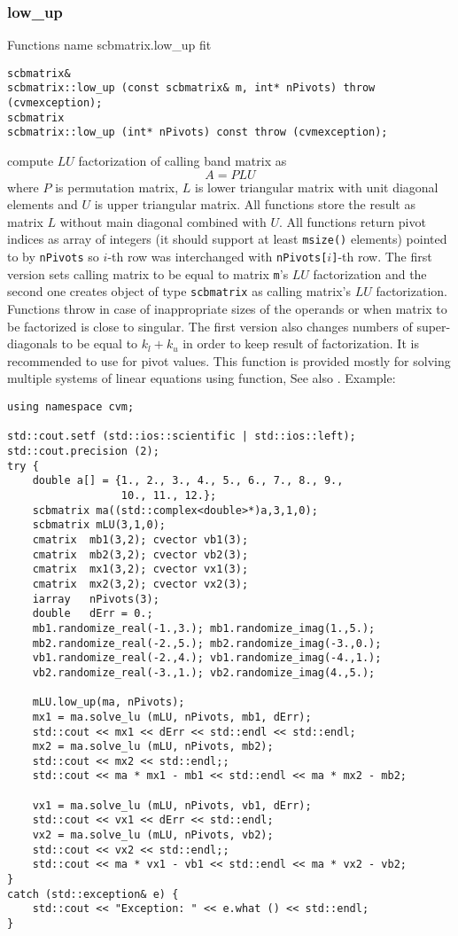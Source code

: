 \subsubsection{low\_up}
Functions%
\pdfdest name {scbmatrix.low_up} fit
\begin{verbatim}
scbmatrix& 
scbmatrix::low_up (const scbmatrix& m, int* nPivots) throw (cvmexception);
scbmatrix
scbmatrix::low_up (int* nPivots) const throw (cvmexception);
\end{verbatim}
compute  $LU$ factorization of  calling band matrix as
\begin{equation*}
A=PLU
\end{equation*}
where $P$ is  permutation matrix, $L$ is  lower
triangular matrix with unit diagonal
elements and $U$ is  upper triangular matrix.
All  functions store the result as  matrix $L$ without
main diagonal combined with $U$. All  functions
return pivot indices as  array of integers
(it should support at least \verb"msize()" elements)
pointed to by \verb"nPivots" so \hbox{$i$-th} row
was interchanged with \hbox{\verb"nPivots["$i$\verb"]"-th} row.
The first version sets  calling matrix to be equal to matrix
\verb"m"'s $LU$ factorization and the second one
creates  object of type \verb"scbmatrix" as calling matrix's
$LU$ factorization.
Functions throw 
in case of inappropriate
sizes of the operands or when  matrix to be factorized is close to
singular. 
The first version also changes numbers of 
super-diagonals to be equal to $k_l+k_u$
in order to keep  result of factorization.
It is recommended to use 
for pivot values.
This function is provided mostly for solving multiple
systems of linear equations using 
 function,
See also
.
Example:
\begin{Verbatim}
using namespace cvm;

std::cout.setf (std::ios::scientific | std::ios::left); 
std::cout.precision (2);
try {
    double a[] = {1., 2., 3., 4., 5., 6., 7., 8., 9.,
                  10., 11., 12.};
    scbmatrix ma((std::complex<double>*)a,3,1,0);
    scbmatrix mLU(3,1,0);
    cmatrix  mb1(3,2); cvector vb1(3);
    cmatrix  mb2(3,2); cvector vb2(3);
    cmatrix  mx1(3,2); cvector vx1(3);
    cmatrix  mx2(3,2); cvector vx2(3);
    iarray   nPivots(3);
    double   dErr = 0.;
    mb1.randomize_real(-1.,3.); mb1.randomize_imag(1.,5.);
    mb2.randomize_real(-2.,5.); mb2.randomize_imag(-3.,0.);
    vb1.randomize_real(-2.,4.); vb1.randomize_imag(-4.,1.);
    vb2.randomize_real(-3.,1.); vb2.randomize_imag(4.,5.);

    mLU.low_up(ma, nPivots);
    mx1 = ma.solve_lu (mLU, nPivots, mb1, dErr);
    std::cout << mx1 << dErr << std::endl << std::endl;
    mx2 = ma.solve_lu (mLU, nPivots, mb2);
    std::cout << mx2 << std::endl;;
    std::cout << ma * mx1 - mb1 << std::endl << ma * mx2 - mb2;

    vx1 = ma.solve_lu (mLU, nPivots, vb1, dErr);
    std::cout << vx1 << dErr << std::endl;
    vx2 = ma.solve_lu (mLU, nPivots, vb2);
    std::cout << vx2 << std::endl;;
    std::cout << ma * vx1 - vb1 << std::endl << ma * vx2 - vb2;
}
catch (std::exception& e) {
    std::cout << "Exception: " << e.what () << std::endl;
}
\end{Verbatim}
